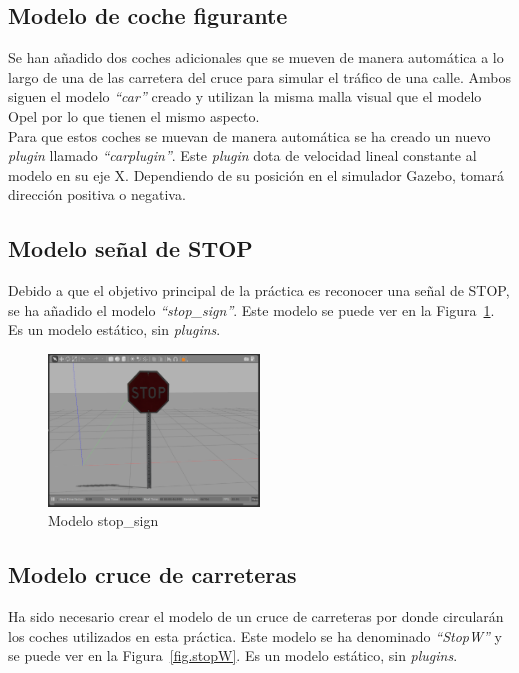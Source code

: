 \subsection{Modelo de coche figurante}
Se han añadido dos coches adicionales que se mueven de manera automática a lo largo de una de las carretera del cruce para simular el tráfico de una calle. Ambos siguen el modelo \textit{``car''} creado y utilizan la misma malla visual que el modelo Opel por lo que tienen el mismo aspecto. \\

Para que estos coches se muevan de manera automática se ha creado un nuevo \textit{plugin} llamado \textit{``carplugin''}. Este \textit{plugin} dota de velocidad lineal constante al modelo en su eje X. Dependiendo de su posición en el simulador Gazebo, tomará dirección positiva o negativa.


\subsection{Modelo señal de STOP}
Debido a que el objetivo principal de la práctica es reconocer una señal de STOP, se ha añadido el modelo \textit{``stop\_sign''}. Este modelo se puede ver en la Figura~\ref{fig.stopSign}. Es un modelo estático, sin \textit{plugins}.

\begin{figure}[H]
  \begin{center}
    \includegraphics[width=0.5\textwidth]{figures/Stop/stopSign.png}
		\caption{Modelo stop\_sign}
		\label{fig.stopSign}
		\end{center}
\end{figure}

\subsection{Modelo cruce de carreteras}
Ha sido necesario crear el modelo de un cruce de carreteras por donde circularán los coches utilizados en esta práctica. Este modelo se ha denominado \textit{``StopW''} y se puede ver en la Figura~\ref{fig.stopW}. Es un modelo estático, sin \textit{plugins}.

